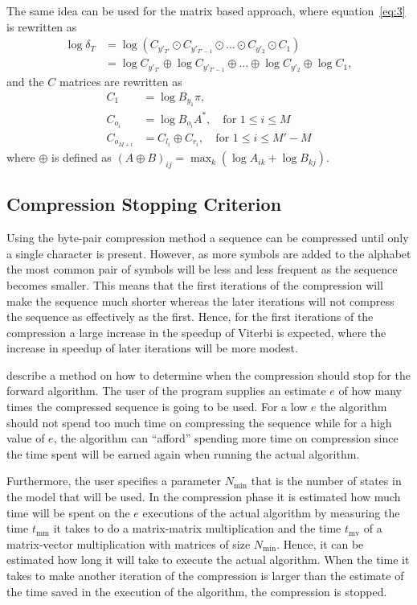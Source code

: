 The same idea can be used for the matrix based approach, where
equation~\eqref{eq:3} is rewritten as
\begin{align*}
  \log \delta_T &= \log \left(C_{y'_{T'}} \odot C_{y'_{T'-1}} \odot \dots \odot
                  C_{y'_2} \odot C_1 \right) \\
                &= \log C_{y'_{T'}} \oplus \log C_{y'_{T'-1}} \oplus \dots \oplus
                  \log C_{y'_2} \oplus \log C_1,
\end{align*}
and the $C$ matrices are rewritten as
\begin{align*}
  C_1 &= \log B_{y_1} \pi, \\
  C_{o_i} &= \log B_{o_i} A^*, \quad \text{for }1 \le i \le M\\
  C_{o_{M + i}} &= C_{l_i} \oplus C_{r_i} , \quad \text{for }1 \le i \le M' - M
\end{align*}
where $\oplus$ is defined as
${ \left( A \oplus B \right)}_{ij} = \max_k \left( \log A_{ik} + \log B_{kj}
\right)$.


\subsection{Compression Stopping Criterion}
\label{sec:compr-stopp-crit}

Using the byte-pair compression method a sequence can be compressed until only
a single character is present. However, as more symbols are added to the
alphabet the most common pair of symbols will be less and less frequent as the
sequence becomes smaller. This means that the first iterations of the
compression will make the sequence much shorter whereas the later iterations
will not compress the sequence as effectively as the first. Hence, for the
first iterations of the compression a large increase in the speedup of Viterbi
is expected, where the increase in speedup of later iterations will be more
modest.

\citet{sand2013ziphmmlib} describe a method on how to determine when the
compression should stop for the forward algorithm. The user of the program
supplies an estimate $e$ of how many times the compressed sequence is going to
be used. For a low $e$ the algorithm should not spend too much time on
compressing the sequence while for a high value of $e$, the algorithm can
``afford'' spending more time on compression since the time spent will be
earned again when running the actual algorithm.

Furthermore, the user specifies a parameter $N_{\text{min}}$ that is the number
of states in the model that will be used. In the compression phase it is
estimated how much time will be spent on the $e$ executions of the actual
algorithm by measuring the time $t_{\text{mm}}$ it takes to do a matrix-matrix
multiplication and the time $t_{\text{mv}}$ of a matrix-vector multiplication
with matrices of size $N_{\text{min}}$. Hence, it can be estimated how long it
will take to execute the actual algorithm. When the time it takes to make
another iteration of the compression is larger than the estimate of the time
saved in the execution of the algorithm, the compression is stopped.

